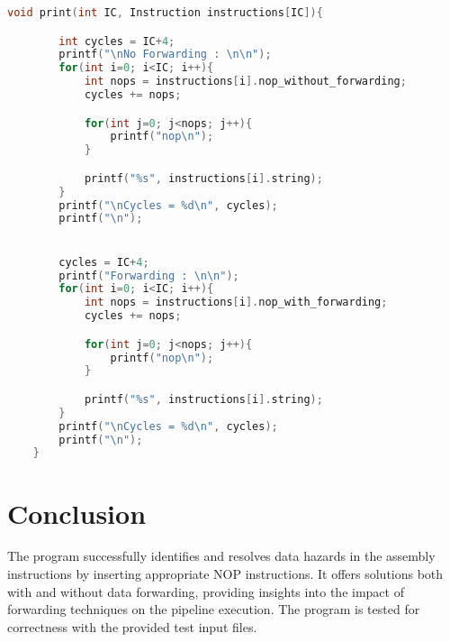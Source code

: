 \documentclass{article}
\begin{document}
\begin{lstlisting}[language=C, caption={get\_rs1\_rs2 function}, label={code-print}, backgroundcolor=\color{codebackground}]
    void print(int IC, Instruction instructions[IC]){

        int cycles = IC+4;
        printf("\nNo Forwarding : \n\n");
        for(int i=0; i<IC; i++){
            int nops = instructions[i].nop_without_forwarding;
            cycles += nops;

            for(int j=0; j<nops; j++){
                printf("nop\n");
            }

            printf("%s", instructions[i].string);
        }
        printf("\nCycles = %d\n", cycles);
        printf("\n");


        cycles = IC+4;
        printf("Forwarding : \n\n");
        for(int i=0; i<IC; i++){
            int nops = instructions[i].nop_with_forwarding;
            cycles += nops;

            for(int j=0; j<nops; j++){
                printf("nop\n");
            }

            printf("%s", instructions[i].string);
        }
        printf("\nCycles = %d\n", cycles);
        printf("\n");
    }
\end{lstlisting}

\section{Conclusion}
The program successfully identifies and resolves data hazards in the assembly instructions by inserting appropriate NOP instructions. It offers solutions both with and without data forwarding, providing insights into the impact of forwarding techniques on the pipeline execution. The program is tested for correctness with the provided test input files.
\end{document}
